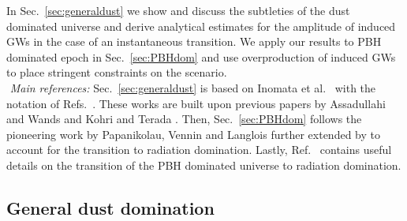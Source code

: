 \documentclass[a4paper,11pt]{article}
\numberwithin{equation}{section}
\begin{document}
In Sec.~\ref{sec:generaldust} we show and discuss the subtleties of the dust dominated universe and derive analytical estimates for the amplitude of induced GWs in the case of an instantaneous transition. We apply our results to PBH dominated epoch in Sec.~\ref{sec:PBHdom} and use overproduction of induced GWs to place stringent constraints on the scenario. \\

\noindent\faBook\,\,\textit{Main references:} Sec.~\ref{sec:generaldust} is based on Inomata et al.~\cite{Inomata:2019ivs,Inomata:2019zqy} with the notation of Refs.~\cite{Domenech:2020ssp,Domenech:2021wkk}. These works are built upon previous papers by Assadullahi and Wands \cite{Assadullahi:2009nf} and Kohri and Terada \cite{Kohri:2018awv}. Then, Sec.~\ref{sec:PBHdom} follows the pioneering work by Papanikolau, Vennin and Langlois \cite{Papanikolaou:2020qtd} further extended by \cite{Domenech:2020ssp} to account for the transition to radiation domination. Lastly, Ref.~\cite{Inomata:2020lmk} contains useful details on the transition of the PBH dominated universe to radiation domination.

\subsection{General dust domination \label{sec:generaldust}}
\end{document}
